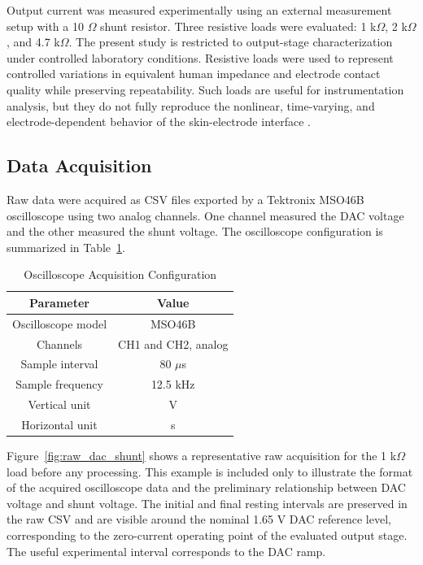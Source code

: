 \documentclass[conference]{IEEEtran}
\begin{document}
Output current was measured experimentally using an external measurement setup with a 10 $\Omega$ shunt resistor. Three resistive loads were evaluated: 1 k$\Omega$, 2 k$\Omega$, and 4.7 k$\Omega$. The present study is restricted to output-stage characterization under controlled laboratory conditions. Resistive loads were used to represent controlled variations in equivalent human impedance and electrode contact quality while preserving repeatability. Such loads are useful for instrumentation analysis, but they do not fully reproduce the nonlinear, time-varying, and electrode-dependent behavior of the skin-electrode interface \cite{ELECTRODE_SKIN_IMPEDANCE}.

\subsection{Data Acquisition}

Raw data were acquired as CSV files exported by a Tektronix MSO46B oscilloscope using two analog channels. One channel measured the DAC voltage and the other measured the shunt voltage. The oscilloscope configuration is summarized in Table~\ref{tab:oscilloscope}. 

\begin{table}[H]
\caption{Oscilloscope Acquisition Configuration}
\begin{center}
\begin{tabular}{|c|c|}
\hline
\textbf{Parameter} & \textbf{Value} \\
\hline
Oscilloscope model & MSO46B \\
\hline
Channels & CH1 and CH2, analog \\
\hline
Sample interval & 80 $\mu$s \\
\hline
Sample frequency & 12.5 kHz \\
\hline
Vertical unit & V \\
\hline
Horizontal unit & s \\
\hline
\end{tabular}
\label{tab:oscilloscope}
\end{center}
\end{table}

Figure~\ref{fig:raw_dac_shunt} shows a representative raw acquisition for the 1 k$\Omega$ load before any processing. This example is included only to illustrate the format of the acquired oscilloscope data and the preliminary relationship between DAC voltage and shunt voltage. The initial and final resting intervals are preserved in the raw CSV and are visible around the nominal 1.65 V DAC reference level, corresponding to the zero-current operating point of the evaluated output stage. The useful experimental interval corresponds to the DAC ramp.
\end{document}

